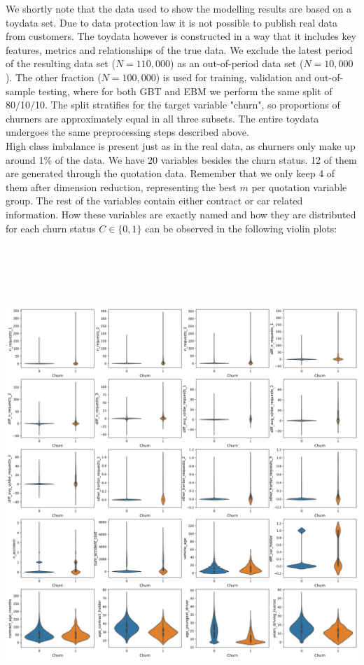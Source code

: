 \documentclass[12pt,titlepage]{article}
\begin{document}
We shortly note that the data used to show the modelling results are based on a toydata set. Due to data protection law it is not possible to publish real data from customers. The toydata however is constructed in a way that it includes key features, metrics and relationships of the true data. We exclude the latest period of the resulting data set ($N=110,000$) as an out-of-period data set ($N=10,000$). The other fraction ($N=100,000$) is used for training, validation and out-of-sample testing, where for both GBT and EBM we perform the same split of 80/10/10. The split stratifies for the target variable "churn", so proportions of churners are approximately equal in all three subsets. The entire toydata undergoes the same preprocessing steps described above. \\
High class imbalance is present just as in the real data, as churners only make up around 1\% of the data. We have 20 variables besides the churn status. 12 of them are generated through the quotation data. Remember that we only keep 4 of them after dimension reduction, representing the best $m$ per quotation variable group. The rest of the variables contain either contract or car related information. How these variables are exactly named and how they are distributed for each churn status $C\in \{0,1\}$ can be observed in the following violin plots: \\
\centerline{\includegraphics[height=18cm]{violin.png}}
\end{document}
